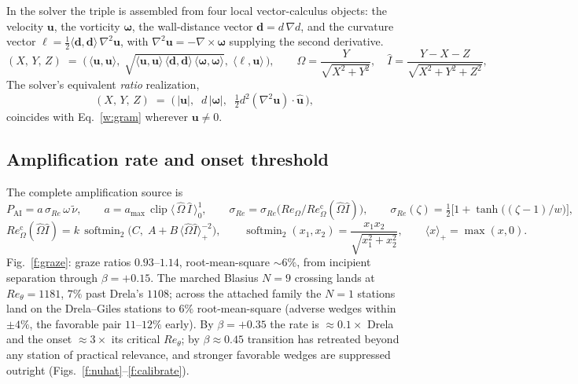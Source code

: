 \documentclass[10pt]{article}
\begin{document}
In the solver the triple is assembled from four local vector-calculus
objects: the velocity $\mathbf u$, the vorticity
$\boldsymbol\omega$, the wall-distance vector
$\mathbf d=d\,\nabla d$, and the curvature vector
$\boldsymbol\ell=\tfrac12\langle\mathbf d,\mathbf d\rangle\,\nabla^2\mathbf u$,
with $\nabla^2\mathbf u=-\nabla\times\boldsymbol\omega$ supplying the
second derivative.
\begin{equation}
  (X,\,Y,\,Z) \;=\;
  \Big(\,\langle\mathbf u,\mathbf u\rangle,\;
  \sqrt{\langle\mathbf u,\mathbf u\rangle\,
        \langle\mathbf d,\mathbf d\rangle\,
        \langle\boldsymbol\omega,\boldsymbol\omega\rangle},\;
  \langle\boldsymbol\ell,\mathbf u\rangle\,\Big),
  \qquad
  \hat\Omega = \frac{Y}{\sqrt{X^2+Y^2}}, \quad
  \hat I = \frac{Y-X-Z}{\sqrt{X^2+Y^2+Z^2}},
  \label{w:gram}
\end{equation}
The solver's equivalent \emph{ratio} realization,
\begin{equation}
  (X,\,Y,\,Z) \;=\;
  \big(\,|\mathbf u|,\;\; d\,|\boldsymbol\omega|,\;\;
  \tfrac12 d^2(\nabla^2\mathbf u)\!\cdot\!\hat{\mathbf u}\,\big),
  \label{w:ratio}
\end{equation}
coincides with Eq.~\eqref{w:gram} wherever $\mathbf u\neq0$.

\subsection{Amplification rate and onset threshold}

The complete amplification source is
\begin{equation}
  P_{\mathrm{AI}} = a\,\sigma_{Re}\,\omega\,\tilde\nu, \qquad
  a = a_{\max}\,\operatorname{clip}\!\big\langle\,\hat\Omega\,\hat I\,\big\rangle_{0}^{1},
  \qquad
  \sigma_{Re} = \sigma_{Re}\!\big(Re_\Omega/Re_\Omega^{\mathrm c}(\hat\Omega\hat I)\big), \qquad
  \sigma_{Re}(\zeta)=\tfrac12\big[1+\tanh\!\big((\zeta-1)/w\big)\big],
  \label{w:rate}
\end{equation}
\begin{equation}
  Re_\Omega^{\mathrm c}(\hat\Omega\hat I) = k\,\operatorname{softmin}_2\!\Big(C,\;
      A + B\,\langle\hat\Omega\hat I\rangle_+^{-2}\Big),
  \qquad
  \operatorname{softmin}_2(x_1,x_2)=\frac{x_1x_2}{\sqrt{x_1^2+x_2^2}},
  \qquad \langle x\rangle_+=\max(x,0).
  \label{w:onset}
\end{equation}
Fig.~\ref{f:graze}: graze ratios $0.93$--$1.14$,
root-mean-square $\sim6\%$, from incipient separation through
$\beta=+0.15$. The marched Blasius $N\!=\!9$ crossing lands at
$Re_\theta=1181$, $7\%$ past Drela's $1108$; across the attached
family the $N\!=\!1$ stations land on the Drela--Giles stations to
$6\%$ root-mean-square (adverse wedges within $\pm4\%$, the favorable
pair $11$--$12\%$ early). By $\beta=+0.35$ the rate is
$\approx0.1\times$ Drela and the onset $\approx3\times$ its critical
$Re_\theta$; by $\beta\approx0.45$ transition has retreated beyond any
station of practical relevance, and stronger favorable wedges are
suppressed outright (Figs.~\ref{f:nuhat}--\ref{f:calibrate}).
\end{document}
